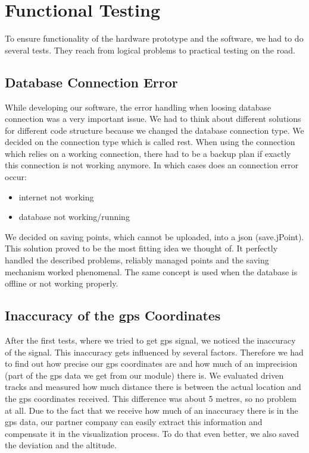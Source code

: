 \section{Functional Testing}
To ensure functionality of the hardware prototype and the software, we had to do several tests. They reach from logical problems to practical testing on the road.
\subsection{Database Connection Error}
While developing our software, the error handling when loosing database connection was a very important issue. We had to think about different solutions for different code structure because we changed the database connection type. 
\newline \newline
We decided on the connection type which is called \gls{rest}. When using the connection which relies on a working connection, there had to be a backup plan if exactly this connection is not working anymore.
\newline \newline
In which cases does an connection error occur:
\begin{itemize}
\item internet not working
\item database not working/running
\end{itemize}
We decided on saving points, which cannot be uploaded, into a \gls{json} (save.jPoint). This solution proved to be the most fitting idea we thought of. It perfectly handled the described problems, reliably managed points and the saving mechanism worked phenomenal.
\newline \newline
The same concept is used when the database is offline or not working properly. 

\subsection{Inaccuracy of the \gls{gps} Coordinates}
After the first tests, where we tried to get \gls{gps} signal, we noticed the inaccuracy of the signal. This inaccuracy gets influenced by several factors. Therefore we had to find out how precise our \gls{gps} coordinates are and how much of an imprecision (part of the \gls{gps} data we get from our module) there is. 
\newline \newline
We evaluated driven tracks and measured how much distance there is between the actual location and the \gls{gps} coordinates received. This difference was about 5 metres, so no problem at all. 
\newline \newline
Due to the fact that we receive how much of an inaccuracy there is in the \gls{gps} data, our partner company can easily extract this information and compensate it in the visualization process. To do that even better, we also saved the deviation and the altitude.

